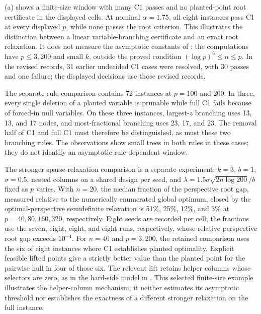 

(a) shows a finite-size window with many
C1 passes and no planted-point root certificate in the displayed cells.
At nominal $\alpha=1.75$, all eight instances pass C1 at every displayed
$p$, while none passes the root criterion. This illustrates the
distinction between a linear variable-branching certificate and an exact
root relaxation. It does not measure the asymptotic constants of
: the computations have $p\leq3,200$ and small $k$,
outside the proved condition $(\log p)^6\leq n\leq p$. In the revised
records, 31 earlier undecided C1 cases were
resolved, with 30 passes and one failure; the displayed decisions use those
revised records.

The separate rule comparison contains 72 instances at $p=100$ and $200$.
In three, every single deletion of a planted variable is prunable while
full C1 fails because of forced-in null variables. On these three instances,
largest-$z$ branching uses 13, 13, and 17 nodes, and most-fractional
branching uses 23, 17, and 23. The removal half of C1 and full C1 must
therefore be distinguished, as must these two branching rules. The
observations show small trees in both rules in these cases; they do not
identify an asymptotic rule-dependent window.

The stronger sparse-relaxation comparison is a separate experiment:
$k=3$, $b=1$, $\sigma=0.5$, nested columns on a shared design per seed,
and $\lambda=1.5\sigma\sqrt{2n\log 200}/b$ fixed as $p$ varies.
With $n=20$, the median fraction of the perspective root gap, measured
relative to the numerically enumerated global optimum, closed by the
optimal-perspective semidefinite relaxation is 51\%, 25\%, 12\%, and 3\%
at $p=40,80,160,320$, respectively. Eight seeds are recorded per cell;
the fractions use the seven, eight, eight, and eight runs, respectively,
whose relative perspective root gap exceeds $10^{-4}$.
For $n=40$
and $p=3,200$, the retained comparison uses the six of eight instances
where C1 establishes planted optimality. Explicit feasible lifted points
give a strictly better value than the planted point for the pairwise hull
in four of those six. The relevant lift retains helper columns whose
selectors are zero, as in the hard-side model in . This selected
finite-size example illustrates the helper-column mechanism; it neither
estimates its asymptotic threshold nor establishes the exactness of a
different stronger relaxation on the full instance.

